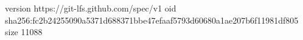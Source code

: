 version https://git-lfs.github.com/spec/v1
oid sha256:fc2b24255090a5371d688371bbe47efaaf5793d60680a1ae207b6f11981df805
size 11088
